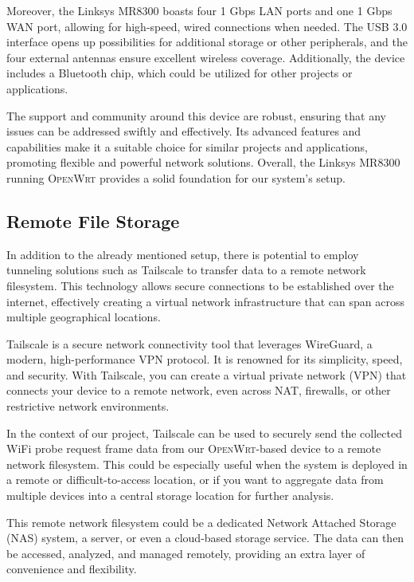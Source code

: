 \documentclass{article}
\begin{document}
Moreover, the Linksys MR8300 boasts four 1 Gbps LAN ports and one 1 Gbps WAN port, allowing for high-speed, wired connections when needed. The USB 3.0 interface opens up possibilities for additional storage or other peripherals, and the four external antennas ensure excellent wireless coverage. Additionally, the device includes a Bluetooth chip, which could be utilized for other projects or applications.

The support and community around this device are robust, ensuring that any issues can be addressed swiftly and effectively. Its advanced features and capabilities make it a suitable choice for similar projects and applications, promoting flexible and powerful network solutions. Overall, the Linksys MR8300 running \textsc{OpenWrt} provides a solid foundation for our system's setup.

\subsection{Remote File Storage}

In addition to the already mentioned setup, there is potential to employ tunneling solutions such as Tailscale to transfer data to a remote network filesystem. This technology allows secure connections to be established over the internet, effectively creating a virtual network infrastructure that can span across multiple geographical locations.

Tailscale is a secure network connectivity tool that leverages WireGuard, a modern, high-performance VPN protocol. It is renowned for its simplicity, speed, and security. With Tailscale, you can create a virtual private network (VPN) that connects your device to a remote network, even across NAT, firewalls, or other restrictive network environments.

In the context of our project, Tailscale can be used to securely send the collected WiFi probe request frame data from our \textsc{OpenWrt}-based device to a remote network filesystem. This could be especially useful when the system is deployed in a remote or difficult-to-access location, or if you want to aggregate data from multiple devices into a central storage location for further analysis.

This remote network filesystem could be a dedicated Network Attached Storage (NAS) system, a server, or even a cloud-based storage service. The data can then be accessed, analyzed, and managed remotely, providing an extra layer of convenience and flexibility.
\end{document}
